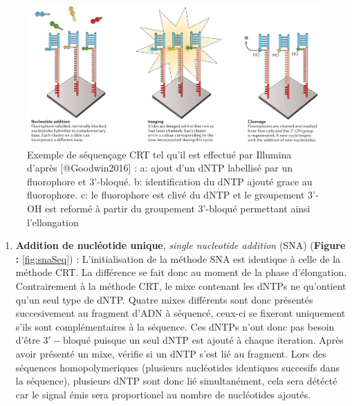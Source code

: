 \documentclass[12pt,twoside]{reedthesis}
\providecommand{\tightlist}{%
  \setlength{\itemsep}{0pt}\setlength{\parskip}{0pt}}
\theoremstyle{definition}
\theoremstyle{definition}
\theoremstyle{remark}
\begin{document}
  \begin{figure}
  
  {\centering \includegraphics[scale=.28]{figure/CRT_seq_illumina} 
  
  }
  
  \caption[Exemple de séquençage CRT tel qu'il est effectué par Illumina]{Exemple de séquençage CRT tel qu'il est effectué par Illumina d'après [@Goodwin2016] : a: ajout d'un dNTP labellisé par un fluorophore et 3'-bloqué. b: identification du dNTP ajouté grace au fluorophore. c: le fluorophore est clivé du dNTP et le groupement 3'-OH est reformé à partir du groupement 3'-bloqué permettant ainsi l'ellongation}\label{fig:crtSeq}
  \end{figure}
  
  \begin{enumerate}
  \def\labelenumi{\alph{enumi}.}
  \setcounter{enumi}{1}
  \tightlist
  \item
    \textbf{Addition de nucléotide unique}, \emph{single nucleotide
    addition} (SNA) (\textbf{Figure : }\ref{fig:snaSeq}) :
    L'initialisation de la méthode SNA est identique à celle de la méthode
    CRT. La différence se fait donc au moment de la phase d'élongation.
    Contrairement à la méthode CRT, le mixe contenant les dNTPs ne
    qu'ontient qu'un seul type de dNTP. Quatre mixes différents sont donc
    présentés succesivement au fragment d'ADN à séquencé, ceux-ci se
    fixeront uniquement s'ils sont complémentaires à la séquence. Ces
    dNTPs n'ont donc pas besoin d'être \(\mathrm{3'-bloqué}\) puisque un
    seul dNTP est ajouté à chaque iteration. Après avoir présenté un mixe,
    vérifie si un dNTP s'est lié au fragment. Lors des séquences
    homopolymeriques (plusieurs nucléotides identiques succesifs dans la
    séquence), plusieurs dNTP sont donc lié simultanément, cela sera
    détécté car le signal émis sera proportionel au nombre de nucléotides
    ajoutés.
  \end{enumerate}
  
\end{document}
